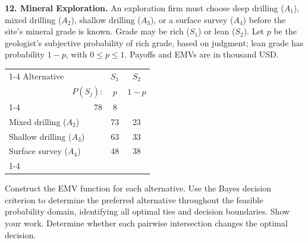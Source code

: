 \noindent\begin{minipage}[t][0.48\textheight][t]{\textwidth}
\textbf{12. Mineral Exploration.} An exploration firm must choose deep drilling ($A_1$), mixed drilling
($A_2$), shallow drilling ($A_3$), or a surface survey ($A_4$) before
the site's mineral grade is known. Grade may be rich ($S_1$) or lean
($S_2$). Let $p$ be the geologist's subjective probability of rich grade,
based on judgment; lean grade has probability $1-p$, with $0\leq p\leq1$.
Payoffs and EMVs are in thousand USD.

\begin{center}
		\renewcommand{\arraystretch}{1.3}
		\small
		\begin{tabular}{lr@{\qquad}cc}
			\cmidrule{1-4}
			Alternative & & $S_1$ & $S_2$ \\
			& $P(S_j)$: & $p$ & $1-p$ \\
			\cmidrule{1-4}
			\multicolumn{2}{l}{Deep drilling ($A_1$)} & 78 & 8 \\
			\multicolumn{2}{l}{Mixed drilling ($A_2$)} & 73 & 23 \\
			\multicolumn{2}{l}{Shallow drilling ($A_3$)} & 63 & 33 \\
			\multicolumn{2}{l}{Surface survey ($A_4$)} & 48 & 38 \\
			\cmidrule{1-4}
		\end{tabular}
	\end{center}

Construct the EMV function for each alternative. Use the Bayes decision criterion to determine the preferred alternative throughout the feasible probability domain, identifying all optimal ties and decision boundaries. Show your work. Determine whether each pairwise intersection changes the optimal decision.
\par\vfill
\end{minipage}\par

\newpage

